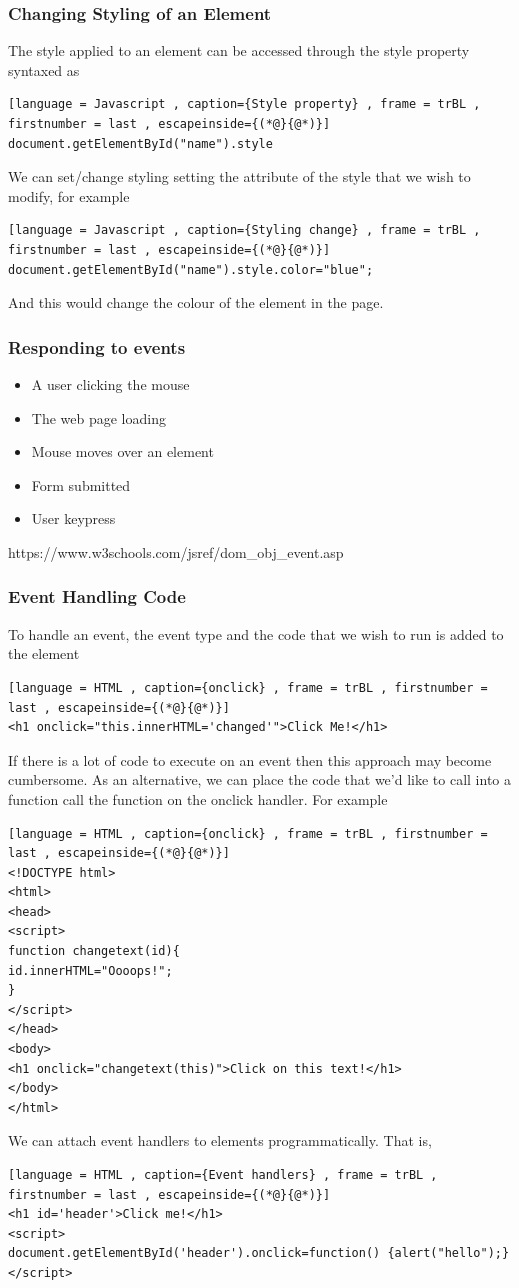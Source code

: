 \documentclass[a4paper]{article}
\theoremstyle{plain}
\theoremstyle{definition}
\theoremstyle{remark}
\begin{document}
\begin{flushleft}
\subsubsection{Changing Styling of an Element}
The style applied to an element can be accessed through the style property syntaxed as
\begin{lstlisting}[language = Javascript , caption={Style property} , frame = trBL , firstnumber = last , escapeinside={(*@}{@*)}]
document.getElementById("name").style
\end{lstlisting}
We can set/change styling setting the attribute of the style that we wish to modify, for example
\begin{lstlisting}[language = Javascript , caption={Styling change} , frame = trBL , firstnumber = last , escapeinside={(*@}{@*)}]
document.getElementById("name").style.color="blue";
\end{lstlisting}
And this would change the colour of the element in the page.
\subsubsection{Responding to events}
\begin{itemize}
	\item A user clicking the mouse
	\item The web page loading
	\item Mouse moves over an element
	\item Form submitted
	\item User keypress
\end{itemize}
https://www.w3schools.com/jsref/dom_obj_event.asp
\subsubsection{Event Handling Code}
To handle an event, the event type and the code that we wish to run is added to the element
\begin{lstlisting}[language = HTML , caption={onclick} , frame = trBL , firstnumber = last , escapeinside={(*@}{@*)}]
<h1 onclick="this.innerHTML='changed'">Click Me!</h1>
\end{lstlisting}
If there is a lot of code to execute on an event then this approach may become cumbersome. As an alternative, we can place the code that we'd like to call into a function call the function on the onclick handler. For example
\begin{lstlisting}[language = HTML , caption={onclick} , frame = trBL , firstnumber = last , escapeinside={(*@}{@*)}]
<!DOCTYPE html>
<html>
<head>
<script>
function changetext(id){
id.innerHTML="Oooops!";
}
</script>
</head>
<body>
<h1 onclick="changetext(this)">Click on this text!</h1>
</body>
</html>
\end{lstlisting}
We can attach event handlers to elements programmatically. That is,
\begin{lstlisting}[language = HTML , caption={Event handlers} , frame = trBL , firstnumber = last , escapeinside={(*@}{@*)}]
<h1 id='header'>Click me!</h1>
<script>
document.getElementById('header').onclick=function() {alert("hello");}
</script>
\end{lstlisting}

\end{flushleft}
\end{document}

